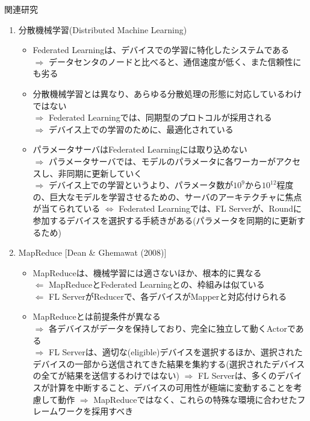 \documentclass[dvipdfmx,notheorems,t]{beamer}
\begin{document}
\begin{frame}{関連研究}
\begin{enumerate}
	\framebreak
	
	\item 分散機械学習(Distributed Machine Learning)
	\begin{itemize}
		\item Federated Learningは、デバイスでの学習に特化したシステムである \\
		$\Rightarrow$ データセンタのノードと比べると、通信速度が低く、また信頼性にも劣る
		\newline
		
		\item 分散機械学習とは異なり、あらゆる分散処理の形態に対応しているわけではない \\
		$\Rightarrow$ Federated Learningでは、同期型のプロトコルが採用される \\
		$\Rightarrow$ デバイス上での学習のために、最適化されている
		\newline
		
		\item パラメータサーバはFederated Learningには取り込めない \\
		$\Rightarrow$ パラメータサーバでは、モデルのパラメータに各ワーカーがアクセスし、非同期に更新していく \\
		$\Rightarrow$ デバイス上での学習というより、パラメータ数が$10^9$から$10^{12}$程度の、巨大なモデルを学習させるための、サーバのアーキテクチャに焦点が当てられている \newline \newline
		$\Leftrightarrow$ Federated Learningでは、FL Serverが、Roundに参加するデバイスを選択する手続きがある(パラメータを同期的に更新するため)
	\end{itemize}
	
	\framebreak
	
	\item MapReduce [Dean \& Ghemawat (2008)]
	\begin{itemize}
		\item MapReduceは、機械学習には適さないほか、根本的に異なる \\
		$\Leftarrow$ MapReduceとFederated Learningとの、枠組みは似ている \\
		$\Leftarrow$ FL ServerがReducerで、各デバイスがMapperと対応付けられる
		\newline
		
		\item MapReduceとは前提条件が異なる \\
		$\Rightarrow$ 各デバイスがデータを保持しており、完全に独立して動くActorである \\
		$\Rightarrow$ FL Serverは、適切な(eligible)デバイスを選択するほか、選択されたデバイスの一部から送信されてきた結果を集約する(選択されたデバイスの全てが結果を送信するわけではない) \newline \newline
		$\Rightarrow$ FL Serverは、多くのデバイスが計算を中断すること、デバイスの可用性が極端に変動することを考慮して動作 \newline \newline
		$\Rightarrow$ MapReduceではなく、これらの特殊な環境に合わせたフレームワークを採用すべき
	\end{itemize}
\end{enumerate}


\end{frame}
\end{document}
